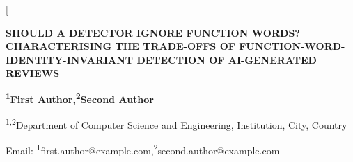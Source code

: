 \documentclass[10pt,twocolumn]{article}
\begin{document}
\twocolumn[%
  {\centering
    {\large\bfseries SHOULD A DETECTOR IGNORE FUNCTION WORDS? CHARACTERISING THE
    TRADE-OFFS OF FUNCTION-WORD-IDENTITY-INVARIANT DETECTION OF AI-GENERATED REVIEWS\par}
    \vspace{0.9em}
    {\normalsize\bfseries \textsuperscript{1}First Author,\quad \textsuperscript{2}Second Author\par}
    \vspace{0.4em}
    {\small \textsuperscript{1,2}Department of Computer Science and Engineering, Institution, City, Country\par}
    \vspace{0.2em}
    {\small Email: \textsuperscript{1}first.author@example.com,\quad \textsuperscript{2}second.author@example.com\par}
    \vspace{0.8em}
  }
\end{document}
